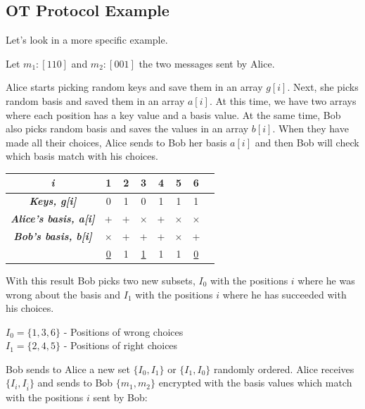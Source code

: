 \subsection{OT Protocol Example}

Let's look in a more specific example.

Let $m_{1}: [1 1 0]$ and $m_{2}:[0 0 1]$ the two messages sent by Alice.

Alice starts picking random keys and save them in an array $g[i]$. Next, she picks random basis and saved them in an array $a[i]$. At this time, we have two arrays where each position has a key value and a basis value.
At the same time, Bob also picks random basis and saves the values in an array $b[i]$.
When they have made all their choices, Alice sends to Bob her basis $a[i]$ and then Bob will check which basis match with his choices.

\begin{table}[H]
\centering
\begin{tabular}{c|c|c|c|c|c|c|c}
\textbf{\textit{i}}         & 1 & 2 & 3 & 4 & 5 & 6      \\ \hline
\textbf{\textit{Keys, g[i]}}  & 0 & 1 & 0 & 1 & 1 & 1     \\ \hline
\textbf{\textit{Alice's basis, a[i]}} & + & + & $\times$ &+ & $\times$ & $\times$ \\ \hline
\textbf{\textit{Bob's basis, b[i]}} & $\times$ & + & + &+ & $\times$ & + \\ \hline

		 & \underline{0} & 1 & \underline{1} & 1 & 1 & \underline{0} \\ \hline
\end{tabular}
\end{table}

With this result Bob picks two new subsets, $I_{0}$ with the positions $i$ where he was wrong about the basis and $I_{1}$ with the positions $i$ where he has succeeded with his choices.

\begin{center}
$I_{0} = \{ 1,3,6 \}$ - Positions of wrong choices\\
$I_{1} = \{ 2,4,5 \}$ - Positions of right choices
\end{center}

Bob sends to Alice a new set $ \{ I_{0},I_{1} \}$ or $\{ I_{1}, I_{0}\}$ randomly ordered. Alice receives $\{ I_{i}, I_{\bar{i}}\}$ and sends to Bob $\{ m_{1}, m_{2}\}$ encrypted with the basis values which match with the positions $i$ sent by Bob:

